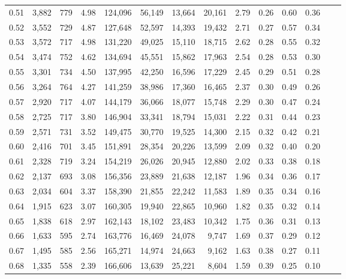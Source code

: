 \begin{tabular}{rrrrrrrrrrrrrr}
0.51 &  3,882 &  779 &    4.98 &  124,096 &   56,149 &  13,664 &  20,161 &  2.79 &  0.26 &  0.60 &      0.36 \\
0.52 &  3,552 &  729 &    4.87 &  127,648 &   52,597 &  14,393 &  19,432 &  2.71 &  0.27 &  0.57 &      0.34 \\
0.53 &  3,572 &  717 &    4.98 &  131,220 &   49,025 &  15,110 &  18,715 &  2.62 &  0.28 &  0.55 &      0.32 \\
0.54 &  3,474 &  752 &    4.62 &  134,694 &   45,551 &  15,862 &  17,963 &  2.54 &  0.28 &  0.53 &      0.30 \\
0.55 &  3,301 &  734 &    4.50 &  137,995 &   42,250 &  16,596 &  17,229 &  2.45 &  0.29 &  0.51 &      0.28 \\
0.56 &  3,264 &  764 &    4.27 &  141,259 &   38,986 &  17,360 &  16,465 &  2.37 &  0.30 &  0.49 &      0.26 \\
0.57 &  2,920 &  717 &    4.07 &  144,179 &   36,066 &  18,077 &  15,748 &  2.29 &  0.30 &  0.47 &      0.24 \\
0.58 &  2,725 &  717 &    3.80 &  146,904 &   33,341 &  18,794 &  15,031 &  2.22 &  0.31 &  0.44 &      0.23 \\
0.59 &  2,571 &  731 &    3.52 &  149,475 &   30,770 &  19,525 &  14,300 &  2.15 &  0.32 &  0.42 &      0.21 \\
0.60 &  2,416 &  701 &    3.45 &  151,891 &   28,354 &  20,226 &  13,599 &  2.09 &  0.32 &  0.40 &      0.20 \\
0.61 &  2,328 &  719 &    3.24 &  154,219 &   26,026 &  20,945 &  12,880 &  2.02 &  0.33 &  0.38 &      0.18 \\
0.62 &  2,137 &  693 &    3.08 &  156,356 &   23,889 &  21,638 &  12,187 &  1.96 &  0.34 &  0.36 &      0.17 \\
0.63 &  2,034 &  604 &    3.37 &  158,390 &   21,855 &  22,242 &  11,583 &  1.89 &  0.35 &  0.34 &      0.16 \\
0.64 &  1,915 &  623 &    3.07 &  160,305 &   19,940 &  22,865 &  10,960 &  1.82 &  0.35 &  0.32 &      0.14 \\
0.65 &  1,838 &  618 &    2.97 &  162,143 &   18,102 &  23,483 &  10,342 &  1.75 &  0.36 &  0.31 &      0.13 \\
0.66 &  1,633 &  595 &    2.74 &  163,776 &   16,469 &  24,078 &   9,747 &  1.69 &  0.37 &  0.29 &      0.12 \\
0.67 &  1,495 &  585 &    2.56 &  165,271 &   14,974 &  24,663 &   9,162 &  1.63 &  0.38 &  0.27 &      0.11 \\
0.68 &  1,335 &  558 &    2.39 &  166,606 &   13,639 &  25,221 &   8,604 &  1.59 &  0.39 &  0.25 &      0.10 \\

\end{tabular}
